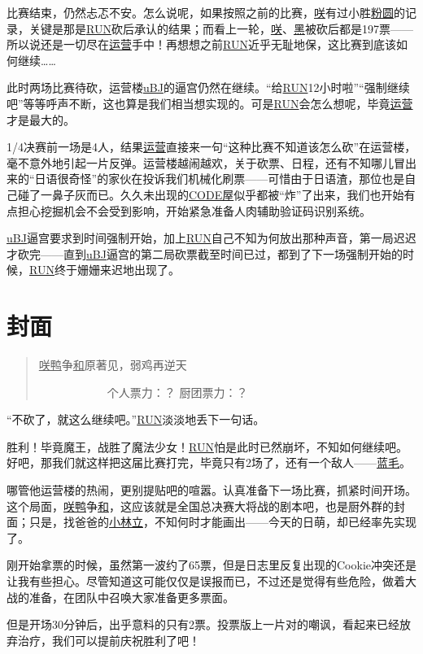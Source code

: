 比赛结束，仍然忐忑不安。怎么说呢，如果按照之前的比赛，\uline{咲}有过小胜\uline{粉圆}的记录，关键是那是\uline{RUN}砍后承认的结果；而看上一轮，\uline{咲}、\uline{黑}被砍后都是197票——所以说还是一切尽在\uline{运营}手中！再想想之前\uline{RUN}近乎无耻地保，这比赛到底该如何继续……

此时两场比赛待砍，运营楼\uline{uBJ}的逼宫仍然在继续。“给\uline{RUN}12小时啦”“强制继续吧”等等呼声不断，这也算是我们相当想实现的。可是\uline{RUN}会怎么想呢，毕竟\uline{运营}才是最大的。

1/4决赛前一场是4人，结果\uline{运营}直接来一句“这种比赛不知道该怎么砍”在运营楼，毫不意外地引起一片反弹。运营楼越闹越欢，关于砍票、日程，还有不知哪儿冒出来的“日语很奇怪”的家伙在投诉我们机械化刷票——可惜由于日语渣，那位也是自己碰了一鼻子灰而已。久久未出现的\uline{CODE屋}似乎都被“炸”了出来，我们也开始有点担心挖掘机会不会受到影响，开始紧急准备人肉辅助验证码识别系统。

\uline{uBJ}逼宫要求到时间强制开始，加上\uline{RUN}自己不知为何放出那种声音，第一局迟迟才砍完——直到\uline{uBJ}逼宫的第二局砍票截至时间已过，都到了下一场强制开始的时候，\uline{RUN}终于姗姗来迟地出现了。

\chapter{封面}
\begin{quote}
\uline{咲}\uline{鸭}争\uline{和}原著见，弱鸡再逆天

　　　　　　个人票力：？ 厨团票力：？
\end{quote}

“不砍了，就这么继续吧。”\uline{RUN}淡淡地丢下一句话。

胜利！毕竟魔王，战胜了魔法少女！\uline{RUN}怕是此时已然崩坏，不知如何继续吧。好吧，那我们就这样把这届比赛打完，毕竟只有2场了，还有一个敌人——\uline{蓝毛}。

哪管他运营楼的热闹，更别提贴吧的喧嚣。认真准备下一场比赛，抓紧时间开场。这个局面，\uline{咲}\uline{鸭}争\uline{和}，这应该就是全国总决赛大将战的剧本吧，也是厨外群的封面；只是，找爸爸的\uline{小林立}，不知何时才能画出——今天的日萌，却已经率先实现了。

刚开始拿票的时候，虽然第一波约了65票，但是日志里反复出现的Cookie冲突还是让我有些担心。尽管知道这可能仅仅是误报而已，不过还是觉得有些危险，做着大战的准备，在团队中召唤大家准备更多票面。

但是开场30分钟后，出乎意料的只有2票。投票版上一片对的嘲讽，看起来已经放弃治疗，我们可以提前庆祝胜利了吧！

